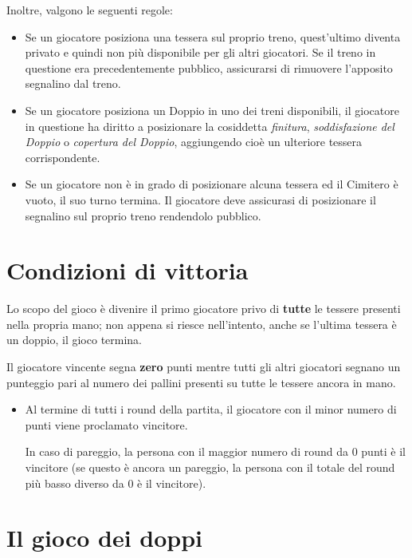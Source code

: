 \documentclass[sigconf,10pt]{acmart}
\begin{document}
Inoltre, valgono le seguenti regole:

\begin{itemize}
\item Se un giocatore posiziona una tessera sul proprio treno, quest'ultimo diventa privato e quindi non più disponibile per gli altri giocatori. Se il treno in questione era precedentemente pubblico, assicurarsi di rimuovere l'apposito segnalino dal treno.

\item Se un giocatore posiziona un Doppio in uno dei treni disponibili, il giocatore in questione ha diritto a posizionare la cosiddetta \textit{finitura}, \textit{soddisfazione del Doppio} o \textit{copertura del Doppio}, aggiungendo cioè un ulteriore tessera corrispondente.

\item Se un giocatore non è in grado di posizionare alcuna tessera ed il Cimitero è vuoto, il suo turno termina. Il giocatore deve assicurasi di posizionare il segnalino sul proprio treno rendendolo pubblico. 

\end{itemize}

\section{Condizioni di vittoria}

Lo scopo del gioco è divenire il primo giocatore privo di \textbf{tutte} le tessere presenti nella propria mano; non appena si riesce nell'intento, anche se l'ultima tessera è un doppio, il gioco termina.

Il giocatore vincente segna \textbf{zero} punti mentre tutti gli altri giocatori segnano un punteggio pari al numero dei pallini presenti su tutte le tessere ancora in mano.

\begin{itemize}
\item Al termine di tutti i round della partita, il giocatore con il minor numero di punti viene proclamato vincitore. 

In caso di pareggio, la persona con il maggior numero di round da $0$ punti è il vincitore (se questo è ancora un pareggio, la persona con il totale del round più basso diverso da $0$ è il vincitore).
\end{itemize}

\section{Il gioco dei doppi}
\end{document}
